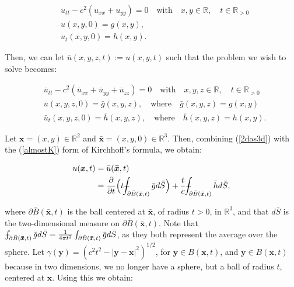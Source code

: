 \documentclass[a4paper, 12pt]{article}
\def\Xint#1{\mathchoice
{\XXint\displaystyle\textstyle{#1}}%
{\XXint\textstyle\scriptstyle{#1}}%
{\XXint\scriptstyle\scriptscriptstyle{#1}}%
{\XXint\scriptscriptstyle\scriptscriptstyle{#1}}%
\!\int}
\def\XXint#1#2#3{{\setbox0=\hbox{$#1{#2#3}{\int}$ }
\vcenter{\hbox{$#2#3$ }}\kern-.6\wd0}}
\def\dashint{\Xint-}
\numberwithin{equation}{section}
\begin{document}
\begin{equation} \label{2d}
    \begin{aligned}
        &u_{tt}-c^2(u_{xx}+u_{yy})=0 \quad \textrm{with} \quad x,y \in \mathbb{R}, \quad t\in \mathbb{R}_{>0}\\
        &u(x, y, 0)=g(x,y),\\
        &u_t(x,y,0)=h(x,y).
    \end{aligned}
\end{equation}

Then, we can let $\bar{u}(x, y, z, t):=u(x, y, t)$ such that the problem we wish
to solve becomes:

\begin{equation} \label{2das3d}
    \begin{aligned}
        &\bar{u}_{tt}-c^2(\bar{u}_{xx}+\bar{u}_{yy}+\bar{u}_{zz})=0 \quad \textrm{with} \quad x,y,z \in \mathbb{R}, \quad t\in \mathbb{R}_{>0}\\
        &\bar{u}(x, y, z, 0)=\bar{g}(x,y,z), \quad \textrm{where} \quad \bar{g}(x,y,z)=g(x,y)\\
        &\bar{u}_t(x,y,z,0)=\bar{h}(x,y,z), \quad \textrm{where} \quad \bar{h}(x,y,z)=h(x,y).
    \end{aligned}
\end{equation}

Let $\boldsymbol{x}=(x,y)\in \mathbb{R}^2$ and $\boldsymbol{\bar{x}}=(x,y, 0)\in
\mathbb{R}^3$. Then, combining (\ref{2das3d}) with the (\ref{almostK}) form of
Kirchhoff's formula, we obtain:

\begin{equation} \label{star}
    \begin{aligned}
        u(\boldsymbol{x},t)&=\bar{u}(\boldsymbol{\bar{x}}, t)\\
        &=\diffp[1]{}{t}\Big(t\dashint_{\partial \bar{B}(\boldsymbol{\bar{x}}, t)} \bar{g} d\bar{S}\Big)+\frac{t}{c} \dashint_{\partial \bar{B}(\boldsymbol{\bar{x}}, t)} \bar{h}d\bar{S},
    \end{aligned}
\end{equation}

where $\partial\bar{B}(\boldsymbol{\bar{x}},t)$ is the ball centered at
$\boldsymbol{\bar{x}}$, of radius $t>0$, in $\mathbb{R}^3$, and that $d\bar{S}$
is the two-dimensional measure on $\partial\bar{B}(\boldsymbol{\bar{x}},t)$.
Note that $\dashint_{\partial \bar{B}(\boldsymbol{\bar{x}}, t)} \bar{g}
d\bar{S}=\frac{1}{4\pi t^2}\int_{\partial \bar{B}(\boldsymbol{\bar{x}},
t)}\bar{g} d\bar{S}$, as they both represent the average over the sphere. Let
$\gamma (\boldsymbol{y})=(c^2 t^2-|\boldsymbol{y}-\boldsymbol{x}|^2)^{1/2}$, for
$\boldsymbol{y} \in B(\boldsymbol{x}, t)$, and $\boldsymbol{y} \in
B(\boldsymbol{x}, t)$ because in two dimensions, we no longer have a sphere, but
a ball of radius $t$, centered at $\boldsymbol{x}$. Using this we obtain:
\end{document}

